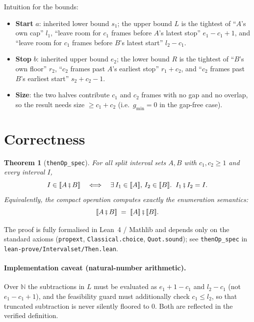 \documentclass[11pt]{article}
\newcommand{\sem}[1]{\llbracket #1 \rrbracket}      %
\newcommand{\Then}{\mathbin{\fatsemi}}              %
\theoremstyle{definition}
\theoremstyle{plain}
\newtheorem{theorem}{Theorem}
\begin{document}
\noindent
Intuition for the bounds:
\begin{itemize}
  \item \textbf{Start} $a$: inherited lower bound $s_1$; the upper bound $L$ is
        the tightest of ``$A$'s own cap'' $l_1$, ``leave room for $c_1$ frames
        before $A$'s latest stop'' $e_1 - c_1 + 1$, and ``leave room for $c_1$
        frames before $B$'s latest start'' $l_2 - c_1$.
  \item \textbf{Stop} $b$: inherited upper bound $e_2$; the lower bound $R$ is
        the tightest of ``$B$'s own floor'' $r_2$, ``$c_2$ frames past $A$'s
        earliest stop'' $r_1 + c_2$, and ``$c_2$ frames past $B$'s earliest
        start'' $s_2 + c_2 - 1$.
  \item \textbf{Size}: the two halves contribute $c_1$ and $c_2$ frames with no
        gap and no overlap, so the result needs size $\ge c_1 + c_2$
        (i.e.\ $g_{\min} = 0$ in the gap-free case).
\end{itemize}

\section{Correctness}
\label{sec:then-correct}

\begin{theorem}[\texttt{thenOp\_spec}]
For all split interval sets $A, B$ with $c_1, c_2 \ge 1$ and every interval
$I$,
\[
  I \in \sem{A \Then B}
  \quad\Longleftrightarrow\quad
  \exists\, I_1 \in \sem{A},\, I_2 \in \sem{B}.\;\; I_1 \Then I_2 = I.
\]
Equivalently, the compact operation computes exactly the enumeration semantics:
\[
  \sem{A \Then B} \;=\; \sem{A} \Then \sem{B}.
\]
\end{theorem}

\noindent
The proof is fully formalised in Lean~4 / Mathlib and depends only on the
standard axioms (\texttt{propext}, \texttt{Classical.choice},
\texttt{Quot.sound}); see \texttt{thenOp\_spec} in
\texttt{lean-prove/Intervalset/Then.lean}.

\paragraph{Implementation caveat (natural-number arithmetic).}
Over $\mathbb{N}$ the subtractions in $L$ must be evaluated as
$e_1 + 1 - c_1$ and $l_2 - c_1$ (not $e_1 - c_1 + 1$), and the feasibility
guard must additionally check $c_1 \le l_2$, so that truncated subtraction is
never silently floored to $0$. Both are reflected in the verified definition.
\end{document}
